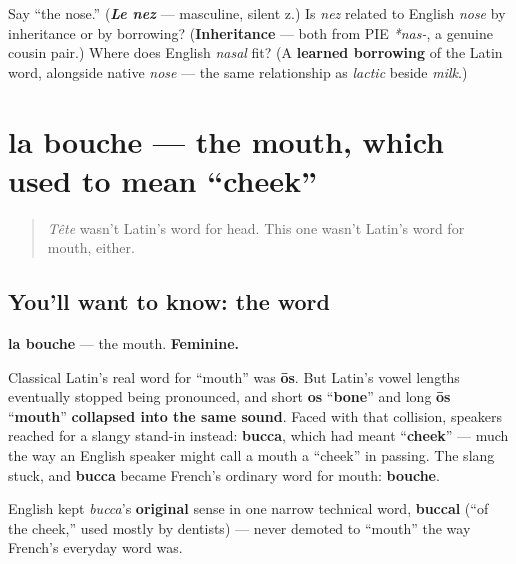 \begin{tcolorbox}[breakable,colback=teal!4,colframe=teal!35!black,title={Before you move on}]
Say \textquotedblleft{}the nose.\textquotedblright{} (\emph{\textbf{Le nez}} — masculine, silent z.) Is \emph{nez} related to English \emph{nose} by inheritance or by borrowing? (\textbf{Inheritance} — both from PIE \emph{*nas-}, a genuine cousin pair.) Where does English \emph{nasal} fit? (A \textbf{learned borrowing} of the Latin word, alongside native \emph{nose} — the same relationship as \emph{lactic} beside \emph{milk}.)
\end{tcolorbox}
\section[la bouche]{la bouche — the mouth, which used to mean \textquotedblleft{}cheek\textquotedblright{}}

\label{lesson:FR-C31-bouche}



\begin{quote}
\emph{Tête} wasn't Latin's word for head. This one wasn't Latin's word for mouth, either.
\end{quote}

\subsection*{You'll want to know: the word}
\textbf{la bouche} — the mouth. \textbf{Feminine.}

\begin{cousinweb}
Classical Latin's real word for \textquotedblleft{}mouth\textquotedblright{} was \textbf{ōs}. But Latin's vowel lengths eventually stopped being pronounced, and short \textbf{os} \textquotedblleft{}\textbf{bone}\textquotedblright{} and long \textbf{ōs} \textquotedblleft{}\textbf{mouth}\textquotedblright{} \textbf{collapsed into the same sound}. Faced with that collision, speakers reached for a slangy stand-in instead: \textbf{bucca}, which had meant \textquotedblleft{}\textbf{cheek}\textquotedblright{} — much the way an English speaker might call a mouth a \textquotedblleft{}cheek\textquotedblright{} in passing. The slang stuck, and \textbf{bucca} became French's ordinary word for mouth: \textbf{bouche}.

English kept \emph{bucca}'s \textbf{original} sense in one narrow technical word, \textbf{buccal} (\textquotedblleft{}of the cheek,\textquotedblright{} used mostly by dentists) — never demoted to \textquotedblleft{}mouth\textquotedblright{} the way French's everyday word was.
\end{cousinweb}

